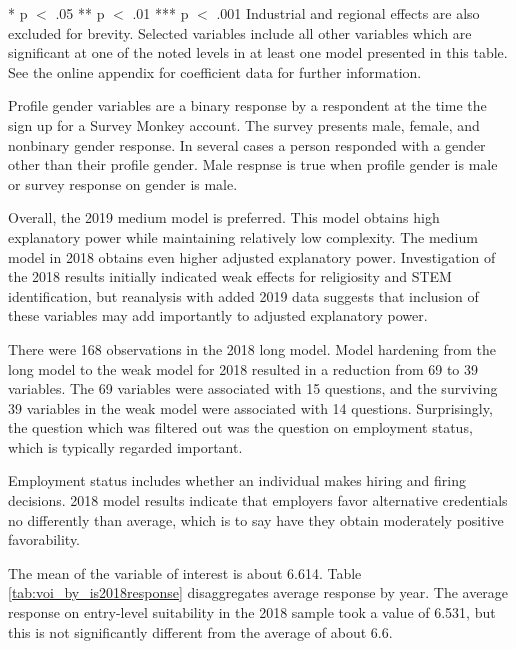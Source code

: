 \documentclass[AER]{./aea-latex-templates/AEA}
\begin{document}
\begin{table}
\begin{tabular}{lllll}
            \end{tabular}
            \begin{tablenotes}
                * p $<$ .05
                ** p $<$ .01
                *** p $<$ .001
                Industrial and regional effects are also excluded for brevity.
                Selected variables include all other variables which are significant at one of the noted levels in at least one model presented in this table.
                See the online appendix for coefficient data for further information.
            \end{tablenotes}
            \label{tab:models}
            \end{table}
        
        Profile gender variables are a binary response by a respondent at the time the sign up for a Survey Monkey account.
        The survey presents male, female, and nonbinary gender response. In several cases a person responded with a gender other than their profile gender.
        Male respnse is true when profile gender is male or survey response on gender is male.
        
        Overall, the 2019 medium model is preferred. This model obtains high explanatory power while maintaining relatively low complexity.
        The medium model in 2018 obtains even higher adjusted explanatory power.
        Investigation of the 2018 results initially indicated weak effects for religiosity and STEM identification,
        but reanalysis with added 2019 data suggests that inclusion of these variables may add importantly to adjusted explanatory power.
        
        There were 168 observations in the 2018 long model. Model hardening from
        the long model to the weak model for 2018 resulted in a reduction from 69
        to 39 variables. The 69 variables were associated with 15 questions, and
        the surviving 39 variables in the weak model were associated with 14
        questions. Surprisingly, the question which was filtered out
        was the question on employment status, which is typically regarded important.
        
        Employment status includes whether an individual makes hiring and firing decisions.
        2018 model results indicate that employers favor alternative credentials
        no differently than average, which is to say have they obtain moderately positive favorability.
        
        The mean of the variable of interest is about 6.614.
        Table \ref{tab:voi_by_is2018response} disaggregates average response by year.
        The average response on entry-level suitability in the 2018
        sample took a value of 6.531, but this is not significantly different
        from the average of about 6.6.
        
\end{document}

